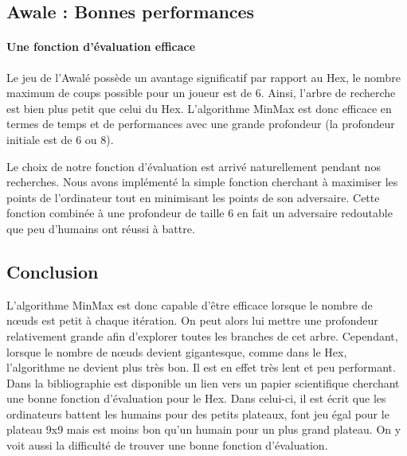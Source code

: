 


\subsection{Awale : Bonnes performances}
\paragraph{Une fonction d'évaluation efficace} Le jeu de l'Awalé possède un avantage significatif par rapport au Hex, le nombre maximum de coups
possible pour un joueur est de 6. Ainsi, l'arbre de recherche est bien plus petit que celui du Hex. L'algorithme MinMax est donc efficace en termes de
temps et de performances avec une grande profondeur (la profondeur initiale est de 6 ou 8).

Le choix de notre fonction d'évaluation est arrivé naturellement pendant nos recherches. Nous avons implémenté la simple fonction cherchant à
maximiser les points de l'ordinateur tout en minimisant les points de son adversaire. Cette fonction combinée à une profondeur de taille 6 en fait un
adversaire redoutable que peu d'humains ont réussi à battre.

\subsection{Conclusion}
L'algorithme MinMax est donc capable d'être efficace lorsque le nombre de nœuds est petit à chaque itération. On peut alors
lui mettre une profondeur relativement grande afin d'explorer toutes les branches de cet arbre.
Cependant, lorsque le nombre de nœuds devient gigantesque, comme dans le Hex, l'algorithme ne devient plus très bon. Il est en effet très lent et peu performant.
Dans la bibliographie est disponible un lien vers un papier scientifique cherchant une bonne fonction d'évaluation pour le Hex.
Dans celui-ci, il est écrit que les ordinateurs battent les humains pour des petits plateaux, font jeu égal pour le plateau 9x9 mais
est moins bon qu'un humain pour un plus grand plateau. On y voit aussi la difficulté de trouver une bonne fonction d'évaluation.
